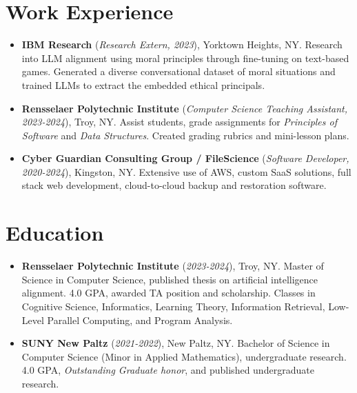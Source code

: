 \documentclass[11pt]{article}
\begin{document}
\section*{Work Experience}
\begin{itemize}
    \itemsep0em 

    \item \textbf{IBM Research} (\textit{Research Extern, 2023}), Yorktown Heights, NY. Research into LLM alignment using moral principles through fine-tuning on text-based games. Generated a diverse conversational dataset of moral situations and trained LLMs to extract the embedded ethical principals.
    
    \item \textbf{Rensselaer Polytechnic Institute} (\textit{Computer Science Teaching Assistant, 2023-2024}), Troy, NY. Assist students, grade assignments for \textit{Principles of Software} and \textit{Data Structures}. Created grading rubrics and mini-lesson plans.
    
    \item \textbf{Cyber Guardian Consulting Group / FileScience} (\textit{Software Developer, 2020-2024}), Kingston, NY. Extensive use of AWS, custom SaaS solutions, full stack web development, cloud-to-cloud backup and restoration software.

\end{itemize}

\section*{Education}
\begin{itemize}
    \itemsep0em

    \item \textbf{Rensselaer Polytechnic Institute} (\textit{2023-2024}), Troy, NY. Master of Science in Computer Science, published thesis on artificial intelligence alignment.  4.0 GPA, awarded TA position and scholarship.  Classes in Cognitive Science, Informatics, Learning Theory, Information Retrieval, Low-Level Parallel Computing, and Program Analysis.
    
    \item \textbf{SUNY New Paltz} (\textit{2021-2022}), New Paltz, NY. Bachelor of Science in Computer Science (Minor in Applied Mathematics), undergraduate research. 4.0 GPA, \textit{Outstanding Graduate honor}, and published undergraduate research.

\end{itemize}
\end{document}
